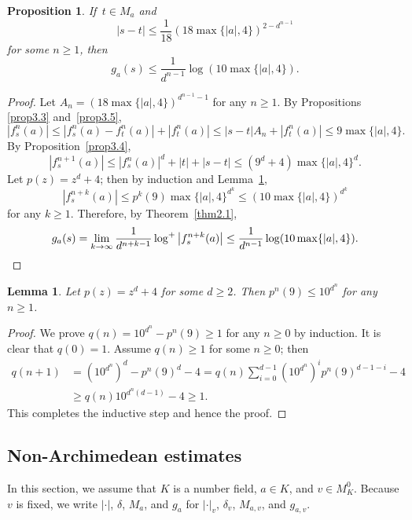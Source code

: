 \documentclass[10pt,a4paper]{amsart}
\numberwithin{equation}{section}
\theoremstyle{plain}
\newtheorem{prop}[thm]{Proposition}
\newtheorem{lem}[thm]{Lemma}
\theoremstyle{definition}
\theoremstyle{remark}
\begin{document}
\begin{prop}\label{prop3.6}
  If\, $t\in M_{a}$ and
\[
|s-t|\leq\frac{1}{18}(18\max\{|a|,4\})^{2-d^{n-1}}
\]
for some $n\geq1$, then
\[
g_{a}(s)\leq\frac{1}{d^{n-1}}\log(10\max\{|a|,4\}).
\]
\end{prop}

\begin{proof}
Let $A_{n}=(18\max\{|a|,4\})^{d^{n-1}-1}$ for any $n\geq1$. By Propositions
\ref{prop3.3} and~\ref{prop3.5},
\[
|f_{s}^{n}(a)|\leq|f_{s}^{n}(a)-f_{t}^{n}(a)|+|f_{t}^{n}(a)|\leq|s-t|A_{n}+|f_{t}^{n}(a)|\leq9\max\{|a|,4\}.
\]
By Proposition~\ref{prop3.4},
\[
\left|f_{s}^{n+1}(a)\right|\leq|f_{s}^{n}(a)|^{d}+|t|+|s-t|\leq\left(9^{d}+4\right)\max\{|a|,4\}^{d}.
\]
Let $p(z)=z^{d}+4$; then by induction and Lemma~\ref{lem3.7},
\[
\left|f_{s}^{n+k}(a)\right|\leq p^{k}(9)\max\{|a|,4\}^{d^{k}}\leq(10\max\{|a|,4\})^{d^{k}}
\]
for any $k\geq1$. Therefore, by Theorem~\ref{thm2.1},
\[
g_{a}(s)=\lim_{k\to\infty}\frac{1}{d^{n+k-1}}\log^{+}\left|f_{s}^{n+k}(a)\right|\leq\frac{1}{d^{n-1}}\log(10\max\{|a|,4\}).\qedhere
\]
\end{proof}

\begin{lem}\label{lem3.7}
Let $p(z)=z^{d}+4$ for some $d\geq2$. Then $p^{n}(9)\leq10^{d^{n}}$
for any $n\geq1$.
\end{lem}

\begin{proof}
We prove $q(n)=10^{d^{n}}-p^{n}(9)\geq1$ for any $n\geq0$ by induction.
It is clear that $q(0)=1$. Assume $q(n)\geq1$ for some $n\geq0$;
then
\begin{align*}
q(n+1) & =\left(10^{d^{n}}\right)^{d}-p^{n}(9)^{d}-4=q(n){\textstyle \sum_{i=0}^{d-1}}\left(10^{d^{n}}\right)^{i}p^{n}(9)^{d-1-i}-4\\
 & \geq q(n)10^{d^{n}(d-1)}-4\geq1.
\end{align*}
This completes the inductive step and hence the proof.
\end{proof}

\subsection{Non-Archimedean estimates}\label{sec3.2}

In this section, we assume that $K$ is a number field, $a\in K$,
and $v\in M_{K}^{0}$. Because $v$ is fixed, we write $|\cdot|$,
$\delta$, $M_{a}$, and $g_{a}$ for $|\cdot|_{v}$, $\delta_{v}$,
$M_{a,v}$, and $g_{a,v}$.
\end{document}
